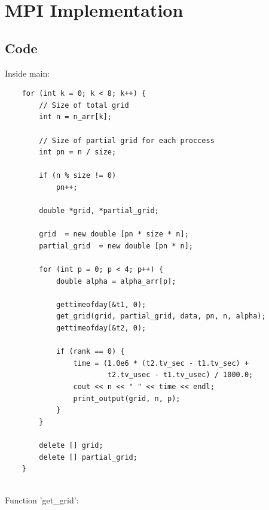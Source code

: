 \documentclass[a4paper,12pt]{article}
\begin{document}
\section{MPI Implementation}

\subsection{Code}

Inside main:

\begin{verbatim}
    for (int k = 0; k < 8; k++) {
        // Size of total grid
        int n = n_arr[k];

        // Size of partial grid for each proccess
        int pn = n / size;

        if (n % size != 0)
            pn++;

        double *grid, *partial_grid;

        grid  = new double [pn * size * n];
        partial_grid  = new double [pn * n];

        for (int p = 0; p < 4; p++) {
            double alpha = alpha_arr[p];

            gettimeofday(&t1, 0);
            get_grid(grid, partial_grid, data, pn, n, alpha);
            gettimeofday(&t2, 0);
            
            if (rank == 0) {
                time = (1.0e6 * (t2.tv_sec - t1.tv_sec) +
                        t2.tv_usec - t1.tv_usec) / 1000.0;
                cout << n << " " << time << endl;
                print_output(grid, n, p);
            }
        }

        delete [] grid;
        delete [] partial_grid;
    }
    
\end{verbatim}

Function 'get\_grid':
\end{document}
